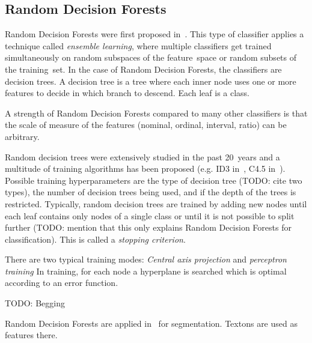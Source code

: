 \subsection{Random Decision Forests}\label{subsec:random-forests}
Random Decision Forests were first proposed in~\cite{ho1995random}. This type
of classifier applies a technique called \textit{ensemble learning}, where
multiple classifiers get trained simultaneously on random subspaces of the
feature~space or random subsets of the training~set. In the case of Random
Decision Forests, the classifiers are decision trees. A decision tree is a tree
where each inner node uses one or more features to decide in which branch to
descend. Each leaf is a class.

A strength of Random Decision Forests compared to many other classifiers is
that the scale of measure of the features (nominal, ordinal, interval, ratio)
can be arbitrary.

Random decision trees were extensively studied in the past 20~years and a
multitude of training algorithms has been proposed (e.g. ID3
in~\cite{quinlan1986induction}, C4.5 in~\cite{quinlan2014c4}). Possible
training hyperparameters are the type of decision tree (TODO: cite two types),
the number of decision trees being used, and if the depth of the trees is
restricted. Typically, random decision trees are trained by adding new nodes
until each leaf contains only nodes of a single class or until it is not
possible to split further (TODO: mention that this only explains Random
Decision Forests for classification). This is called a
\textit{stopping criterion}.

There are two typical training modes: \textit{Central axis projection} and
\textit{perceptron training} In training, for each node a hyperplane is
searched which is optimal according to an error function.

TODO: Begging

Random Decision Forests are applied in~\cite{shotton2008semantic} for
segmentation. Textons are used as features there.
